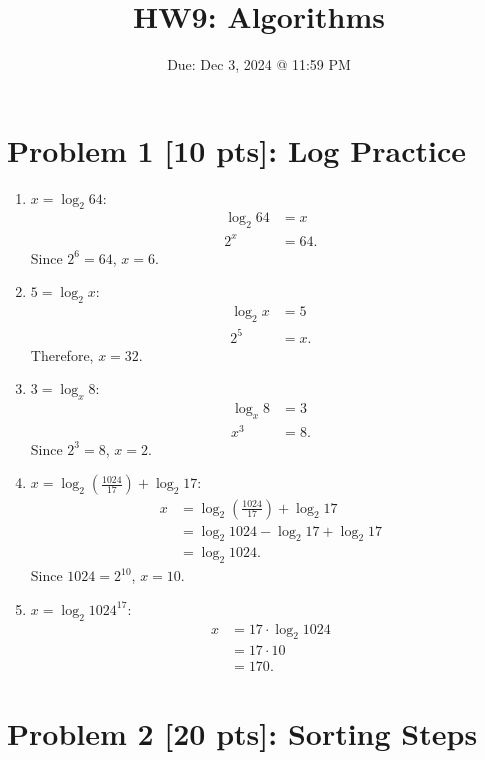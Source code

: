 \documentclass[10pt]{article}
\title{HW9: Algorithms}
\author{}
\date{Due: Dec 3, 2024 @ 11:59 PM}
\begin{document}
\maketitle

\newpage

\section*{Problem 1 [10 pts]: Log Practice}

\begin{enumerate}
    \item \( x = \log_2 64 \):
    \begin{align*}
    \log_2{64} &= x \\
    2^x &= 64.
    \end{align*}
    Since \( 2^6 = 64 \), \( x = 6 \).

    \item \( 5 = \log_2 x \):
    \begin{align*}
    \log_2{x} &= 5 \\
    2^5 &= x.
    \end{align*}
    Therefore, \( x = 32 \).

    \item \( 3 = \log_x 8 \):
    \begin{align*}
    \log_x 8 &= 3 \\
    x^3 &= 8.
    \end{align*}
    Since \( 2^3 = 8 \), \( x = 2 \).

    \item \( x = \log_2 \left(\frac{1024}{17}\right) + \log_2 17 \):
    \begin{align*}
    x &= \log_2 \left(\frac{1024}{17}\right) + \log_2 17 \\
    &= \log_2 1024 - \log_2 17 + \log_2 17 \\
    &= \log_2 1024.
    \end{align*}
    Since \( 1024 = 2^{10} \), \( x = 10 \).

    \item \( x = \log_2 1024^{17} \):
    \begin{align*}
    x &= 17 \cdot \log_2 1024 \\
    &= 17 \cdot 10 \\
    &= 170.
    \end{align*}
\end{enumerate}

\newpage

\section*{Problem 2 [20 pts]: Sorting Steps}
\end{document}

